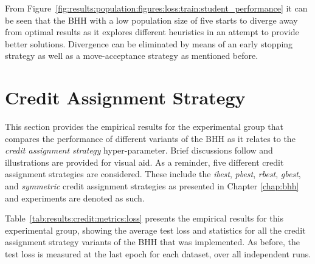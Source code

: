 From Figure~\ref{fig:results:population:figures:loss:train:student_performance} it can be seen that the \acs{BHH} with a low population size of five starts to diverge away from optimal results as it explores different heuristics in an attempt to provide better solutions. Divergence can be eliminated by means of an early stopping strategy as well as a move-acceptance strategy as mentioned before.


\section{Credit Assignment Strategy}\label{sec:results:credit}

This section provides the empirical results for the experimental group that compares the performance of different variants of the \acs{BHH} as it relates to the \textit{credit assignment strategy} hyper-parameter. Brief discussions follow and illustrations are provided for visual aid. As a reminder, five different credit assignment strategies are considered. These include the \textit{ibest}, \textit{pbest}, \textit{rbest}, \textit{gbest}, and \textit{symmetric} credit assignment strategies as presented in Chapter \ref{chap:bhh} and experiments are denoted as such.

Table~\ref{tab:results:credit:metrics:loss} presents the empirical results for this experimental group, showing the average test loss and statistics for all the credit assignment strategy variants of the \acs{BHH} that was implemented. As before, the test loss is measured at the last epoch for each dataset, over all independent runs.

